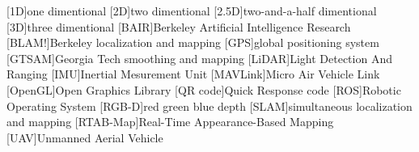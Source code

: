 \begin{acronym}
  [1D]{one dimentional}
  [2D]{two dimentional}
  [2.5D]{two\hyp{}and\hyp{}a\hyp{}half dimentional}
  [3D]{three dimentional}
  [BAIR]{Berkeley Artificial Intelligence Research}
  [BLAM!]{Berkeley localization and mapping}
  [GPS]{global positioning system}
  [GTSAM]{Georgia Tech smoothing and mapping}
  [LiDAR]{Light Detection And Ranging}
  [IMU]{Inertial Mesurement Unit}
  [MAVLink]{Micro Air Vehicle Link}
  [OpenGL]{Open Graphics Library}
  [QR code]{Quick Response code}
  [ROS]{Robotic Operating System}
  [RGB\hyp{}D]{red green blue depth}
  [SLAM]{simultaneous localization and mapping}
  [RTAB-Map]{Real-Time Appearance-Based Mapping}
  [UAV]{Unmanned Aerial Vehicle}
\end{acronym}